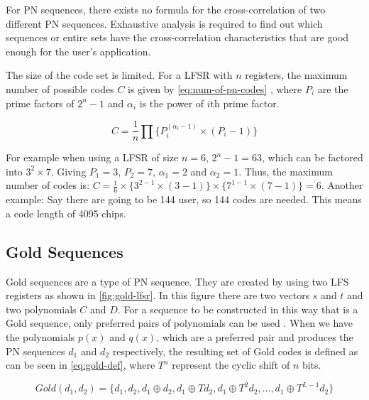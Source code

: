 For PN sequences, there exists no formula for the cross-correlation of two different PN sequences. 
Exhaustive analysis is required to find out which sequences or entire sets have the cross-correlation characteristics that are good enough for the user's application.

The size of the code set is limited.
For a LFSR with $n$ registers, the maximum number of possible codes $C$ is given by \autoref{eq:num-of-pn-codes} \cite{mutagi1996pseudo}, where $P_i$ are the prime factors of $2^n - 1$ and $\alpha_i$ is the power of $i$th prime factor.

\begin{equation}
	\label{eq:num-of-pn-codes}
	C = \frac{1}{n} \prod \{ P_{i} ^ {(\alpha_i - 1)} \times (P_i - 1) \}
\end{equation}

For example when using a LFSR of size $n = 6$, $2^n - 1 = 63$, which can be factored into $3^2 \times 7$.
Giving $P_1 = 3$, $P_2 = 7$, $\alpha_1 = 2$ and $\alpha_2 = 1$.
Thus, the maximum number of codes is: $C = \frac{1}{6} \times \{ 3^{2 - 1} \times (3 - 1) \} \times \{ 7^{1 - 1} \times (7 - 1) \} = 6$.
Another example: Say there are going to be 144 user, so 144 codes are needed. 
This means a code length of 4095 chips.
















\subsection{Gold Sequences}
\label{subsec:gold-sequences}

Gold sequences are a type of PN sequence. 
They are created by using two LFS registers as shown in \autoref{fig:gold-lfsr}.
In this figure there are two vectors $s$ and $t$ and two polynomials $C$ and $D$.
For a sequence to be constructed in this way that is a Gold sequence, only preferred pairs of polynomials can be used \cite{kedia2012comparative}.
When we have the polynomials $p(x)$ and $q(x)$, which are a preferred pair and produces the PN sequences $d_1$ and $d_2$ respectively, the resulting set of Gold codes is defined as can be seen in \autoref{eq:gold-def}, where $T^n$ represent the cyclic shift of $n$ bits.

\begin{equation}
	\label{eq:gold-def}
	Gold(d_1, d_2) = \{ d_1, d_2, d_1 \oplus d_2, d_1 \oplus Td_2, d_1 \oplus T^2d_2, \dotsc, d_1 \oplus T^{L - 1}d_2 \}
\end{equation}


